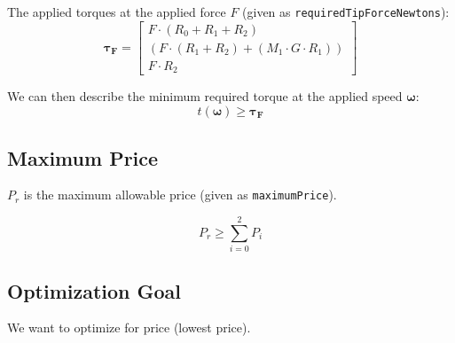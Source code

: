 \documentclass{article}
\begin{document}
The applied torques at the applied force $F$ (given as \texttt{requiredTipForceNewtons}):
\begin{equation}
    \boldsymbol{\tau_{F}}
    =
    \begin{bmatrix}
        F \cdot (R_0 + R_1 + R_2) \\
        (F \cdot (R_1 + R_2) + (M_1 \cdot G \cdot R_1)) \\
        F \cdot R_2
    \end{bmatrix}
\end{equation}

We can then describe the minimum required torque at the applied speed $\boldsymbol{\omega}$:
\begin{equation}
    t(\boldsymbol{\omega}) \geq \boldsymbol{\tau_F}
\end{equation}

\FloatBarrier
\subsection{Maximum Price}

$P_r$ is the maximum allowable price (given as \texttt{maximumPrice}).

\begin{equation}
    P_r \geq \sum_{i=0}^{2}{P_i}
\end{equation}

\FloatBarrier
\subsection{Optimization Goal}

We want to optimize for price (lowest price).
\end{document}
